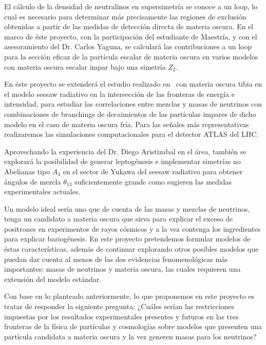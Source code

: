 \begin{darkmatter}
  El cálculo de la densidad de neutralinos en supersimetría se conoce
  a un loop, lo cual es necesario para determinar más precisamente las
  regiones de exclusión obtenidas a partir de las medidas de detección
  directa de materia oscura. En el marco de éste proyecto,
  con la participación del estudiante de Maestría, y con el
  asesoramiento del Dr. Carlos Yaguna, se 
  calculará las contribuciones a un loop para la sección eficaz de la
  partícula escalar de materia oscura en varios  modelos con materia oscura
  escalar impar bajo una simetría $Z_2$.

  En éste proyecto se extenderá el estudio realizado
  en~\cite{Sierra:2008wj} con materia oscura tibia en el modelo seesaw
  radiativo en la intersección de las fronteras de energía e
  intensidad, para estudiar las correlaciones entre mezclas y masas de
  neutrinos con combinaciones de branchings de decaimientos de las
  partículas impares de dicho modelo en el caso de materia oscura
  fría. Para las señales más representativas realizaremos las
  simulaciones computacionales para el detector ATLAS del LHC.
\end{darkmatter}



\begin{leptogenesis}
  Aprovechando la experiencia del Dr. Diego Aristizabal en el área,
  también se explorará la posibilidad de generar leptogénesis e
  implementar simetrías no Abelianas tipo $A_4$ en el sector de Yukawa
  del seesaw radiativo para obtener ángulos de mezcla $\theta_{13}$
  suficientemente grande como sugieren las medidas experimentales
  actuales.
\end{leptogenesis}

Un modelo ideal sería uno que de cuenta de las masas y mezclas de
neutrinos, tenga un candidato a materia oscura que sirva para explicar
el exceso de positrones en experimentos de rayos cósmicos y a la vez
contenga los ingredientes para explicar bariogénesis.  En este
proyecto pretendemos formular modelos de éstas características, además
de continuar explorando otros posibles modelos que puedan dar cuenta
al menos de las dos evidencias fenomenológicas más importantes: masas
de neutrinos y materia oscura, las cuales requieren una extensión del
modelo estándar.


Con base en lo planteado anteriormente, lo que proponemos en este
proyecto es tratar de responder la siguiente pregunta: ¿Cuáles serían
las restricciones impuestas por los resultados experimentales
presentes y futuros en las tres fronteras de la física de partículas y
cosmologías sobre modelos que presenten una partícula candidata a
materia oscura y la vez generen masas para los neutrinos?
 


